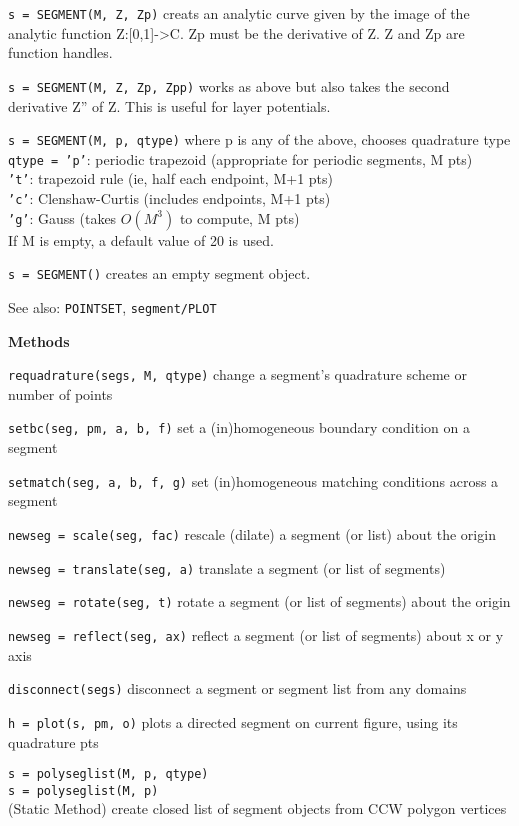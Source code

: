 {\tt s = SEGMENT(M, {Z, Zp})} creats an analytic curve given by the image of 
the analytic function Z:[0,1]->C. Zp must be the derivative of Z. 
Z and Zp are function handles. 
  
{\tt s = SEGMENT(M, {Z, Zp, Zpp})} works as above but also takes the second
derivative Z'' of Z. This is useful for layer potentials.
 
{\tt s = SEGMENT(M, p, qtype)} where p is any of the above, chooses quadrature type\\
    {\tt qtype = 'p'}: periodic trapezoid (appropriate for periodic segments, M pts)\\
          {\tt 't'}: trapezoid rule (ie, half each endpoint, M+1 pts)\\
           {\tt 'c'}: Clenshaw-Curtis (includes endpoints, M+1 pts)\\
           {\tt 'g'}: Gauss (takes $O(M^3)$ to compute, M pts)\\

If M is empty, a default value of 20 is used.

{\tt s = SEGMENT()} creates an empty segment object.

See also: {\tt POINTSET}, {\tt segment/PLOT}

\textbf{Methods}

{\tt requadrature(segs, M, qtype)} change a segment's quadrature
scheme or number of points

{\tt setbc(seg, pm, a, b, f)} set a (in)homogeneous boundary
condition on a segment

{\tt setmatch(seg, a, b, f, g)} set (in)homogeneous matching
conditions across a segment 

{\tt newseg = scale(seg, fac)} rescale (dilate) a segment (or list)
about the origin

{\tt newseg = translate(seg, a)} translate a segment (or list of segments)

{\tt newseg = rotate(seg, t)} rotate a segment (or list of
segments) about the origin

{\tt newseg = reflect(seg, ax)} reflect a segment (or list of
segments) about x or y axis

{\tt disconnect(segs)} disconnect a segment or segment list from any domains

{\tt h = plot(s, pm, o)} plots a directed segment on current
figure, using its quadrature pts


{\tt s = polyseglist(M, p, qtype)}\\
{\tt s = polyseglist(M, p)}\\
(Static Method) create closed list of segment objects from CCW polygon vertices

